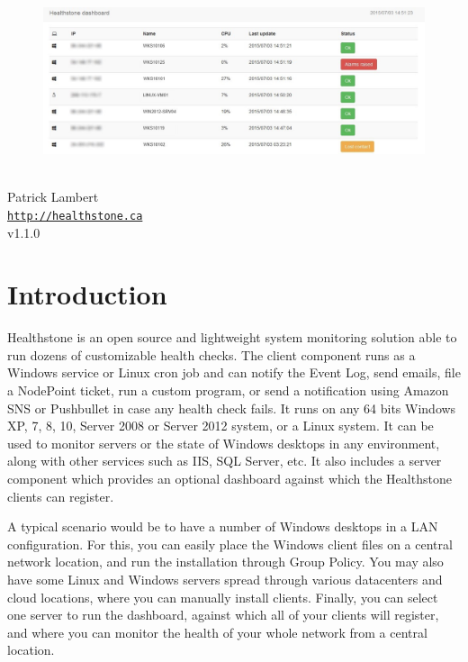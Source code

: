 \documentclass[11pt]{article}
\begin{document}
\begin{titlepage}
\bigskip
\begin{center}
\begin{figure}
\includegraphics[scale=0.6]{splash.jpg}
\end{figure}
\vspace*{1cm}
{
{\Huge \color{headings}{Healthstone Monitoring System}}\\
\bigskip
{\Large Patrick Lambert}\\
\texttt{\url{http://healthstone.ca}}\\
\bigskip
v1.1.0}
\vspace*{\fill}
\end{center}
\end{titlepage}

\tableofcontents

\newpage

\section{Introduction}

Healthstone is an open source and lightweight system monitoring solution able to run dozens of customizable health checks. The client component runs as a Windows service or Linux cron job and can notify the Event Log, send emails, file a NodePoint ticket, run a custom program, or send a notification using Amazon SNS or Pushbullet in case any health check fails. It runs on any 64 bits Windows XP, 7, 8, 10, Server 2008 or Server 2012 system, or a Linux system. It can be used to monitor servers or the state of Windows desktops in any environment, along with other services such as IIS, SQL Server, etc. It also includes a server component which provides an optional dashboard against which the Healthstone clients can register.

A typical scenario would be to have a number of Windows desktops in a LAN configuration. For this, you can easily place the Windows client files on a central network location, and run the installation through Group Policy. You may also have some Linux and Windows servers spread through various datacenters and cloud locations, where you can manually install clients. Finally, you can select one server to run the dashboard, against which all of your clients will register, and where you can monitor the health of your whole network from a central location.
\end{document}
